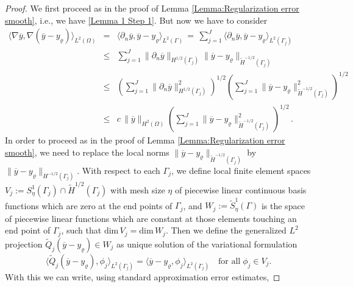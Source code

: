 \documentclass{article}
\numberwithin{equation}{section}
\begin{document}
\begin{proof}
  We first proceed as in the proof of
  Lemma \ref{Lemma:Regularization error smooth}, i.e., we have
  \eqref{Lemma 1 Step 1}. But now we have to consider
  \begin{eqnarray*}
    \langle \nabla \overline{y} ,
    \nabla (\overline{y} - y_\varrho) \rangle_{L^2(\Omega)}
    & = & \langle \partial_n \overline{y} , \overline{y} - y_\varrho
          \rangle_{L^2(\Gamma)} \, = \, \sum\limits_{j=1}^J
          \langle \partial_n \overline{y} , \overline{y} - y_\varrho
          \rangle_{L^2(\Gamma_j)} \\
    & \leq & \sum\limits_{j=1}^J
             \| \partial_n \overline{y} \|_{H^{1/2}(\Gamma_j)}
             \| \overline{y} - y_\varrho \|_{\widetilde{H}^{-1/2}(\Gamma_j)} \\
    & \leq & \left( \sum\limits_{j=1}^J
             \| \partial_n \overline{y} \|^2_{H^{1/2}(\Gamma_j)} \right)^{1/2}
             \left( \sum\limits_{j=1}^J
             \| \overline{y} - y_\varrho \|^2_{\widetilde{H}^{-1/2}(\Gamma_j)}
             \right)^{1/2} \\
    & \leq & c \, \| \overline{y} \|_{H^2(\Omega)}
             \left( \sum\limits_{j=1}^J
             \| \overline{y} - y_\varrho \|^2_{\widetilde{H}^{-1/2}(\Gamma_j)}
             \right)^{1/2} \, .
  \end{eqnarray*}
  In order to proceed as in the proof of
  Lemma \ref{Lemma:Regularization error smooth}, we need to replace
  the local norms
  $\| \overline{y} - y_\varrho \|_{\widetilde{H}^{-1/2}(\Gamma_j)}$ by
  $\| \overline{y} - y_\varrho \|_{H^{-1/2}(\Gamma_j)}$. With respect to
  each $\Gamma_j$, we define local finite element spaces
  $V_j := S_\eta^1(\Gamma_j) \cap \widetilde{H}^{1/2}(\Gamma_j)$ with mesh
  size $\eta$ of piecewise
  linear continuous basis functions which are zero at the end points of
  $\Gamma_j$, and $W_j := \widetilde{S}_\eta^1(\Gamma)$ is the space of
  piecewise linear functions which are constant at those elements touching
  an end point of $\Gamma_j$, such that
  $\mbox{dim} \, V_j = \mbox{dim} \, W_j$.
  Then we define the generalized $L^2$ projection
  $\widetilde{Q}_j (\overline{y} - y_\varrho) \in W_j$ as unique solution
  of the variational formulation
  \[
    \langle \widetilde{Q}_j (\overline{y} - y_\varrho) ,
    \phi_j \rangle_{L^2(\Gamma_j)} =
    \langle \overline{y} - y_\varrho ,
    \phi_j \rangle_{L^2(\Gamma_j)} \quad \mbox{for all} \; \phi_j \in V_j .
  \]
  With this we can write, using standard approximation error estimates,

\end{proof}
\end{document}
